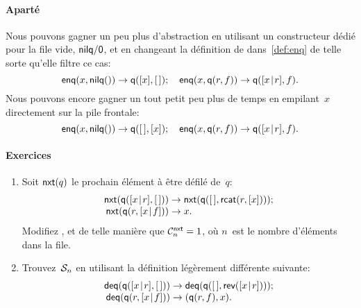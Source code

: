 \paragraph{Aparté}

Nous pouvons gagner un peu plus d'abstraction en utilisant un constructeur dédié pour la file vide, \(\fun{nilq/0}\), et en changeant la définition de
 dans~\eqref{def:enq}  de telle sorte qu'elle
filtre ce cas:
\begin{equation*}
\fun{enq}(x,\fun{nilq}()) \rightarrow \fun{q}([x],\el);
\quad
\fun{enq}(x,\fun{q}(r,f)) \rightarrow \fun{q}(\cons{x}{r},f).
\end{equation*}
Nous pouvons encore gagner un tout petit peu plus de temps en
empilant~\(x\) directement sur la pile frontale:
\begin{equation*}
\fun{enq}(x,\fun{nilq}()) \rightarrow \fun{q}(\el,[x]);
\quad
\fun{enq}(x,\fun{q}(r,f)) \rightarrow \fun{q}(\cons{x}{r},f).
\end{equation*}

\paragraph{Exercices}
\begin{enumerate}

  \item Soit \(\fun{nxt}(q)\) le prochain
    élément à être défilé de~\(q\):
    \begin{equation*}
      \begin{array}{r@{\;}l@{\;}l}
        \fun{nxt}(\fun{q}(\cons{x}{r},\el)) & \rightarrow
        & \fun{nxt}(\fun{q}(\el,\fun{rcat}(r,[x])));\\
        \fun{nxt}(\fun{q}(r,\cons{x}{f})) & \rightarrow & x.
        \index{q@\fun{q/2}}
      \end{array}
    \end{equation*}
    Modifiez ,
     et
     de telle manière que
    \(\C{\fun{nxt}}{n} = 1\), où
    \(n\)~est le nombre d'éléments dans la file.

    \item Trouvez~\(\A{n}\) en utilisant la définition légèrement
      différente suivante:
      \begin{equation*}
        \begin{array}{@{}r@{\;}l@{\;}l@{}}
          \fun{deq}(\fun{q}(\cons{x}{r},\el))
          & \rightarrow
          & \fun{deq}(\fun{q}(\el,\fun{rev}(\cons{x}{r})));\\
          \fun{deq}(\fun{q}(r,\cons{x}{f}))
          & \rightarrow
          & \pair{\fun{q}(r,f)}{x}.
        \end{array}
      \end{equation*}

\end{enumerate}
